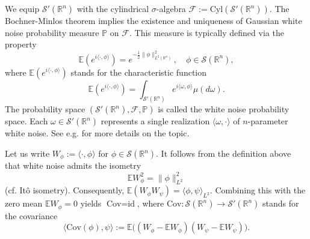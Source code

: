 \documentclass[10pt,a4paper]{article}
\theoremstyle{plain}
\theoremstyle{definition}
\theoremstyle{remark}
\newtheorem{remark}[theorem]{Remark}
\numberwithin{equation}{section}
\newcommand{\R}{\mathbb{R}}
\newcommand{\E}{\mathbb{E}} %
\newcommand{\Cyl}{\text{Cyl}}
\begin{document}
%
We equip $\mathcal{S}'(\R^n)$ with 
 the cylindrical $\sigma$-algebra $\mathcal{F}:=\Cyl ( \mathcal{S}'(\R^n))$.
The Bochner-Minlos theorem \cite[Theorem 2.1]{hida-lectures-book}
% 
 implies the existence and uniqueness of Gaussian white noise probability measure $\mathbb{P}$ on $\mathcal{F}$. 
This measure is  typically defined via the property
 \[
 \E  ( e^{i \langle \cdot, \phi \rangle  } )
 = e^{- \frac{1}{2} \| \phi \|^2_{L^2(\R^n)} }, \quad \phi \in \mathcal{S}(\R^n),
 \]
 where $\E ( e^{i \langle \cdot, \phi \rangle  } ) $ stands for the characteristic function
 \[
 \E  ( e^{i \langle \cdot, \phi \rangle  } ) = \int_{\mathcal{S}'(\R^n) } e^{i \langle \omega , \phi \rangle }  \mu (d\omega). 
 \]
The probability space $(\mathcal{S}'(\R^n),   \mathcal{F} , \mathbb{P} )$ is called the white noise probability space. 
Each $\omega \in \mathcal{S}'(\R^n)$ represents a single realization $\langle \omega, \cdot \rangle$ of $n$-parameter white noise. See e.g. \cite{hida-lectures-book, kuo-book} for more details on the topic.



 Let us write $W_\phi := \langle   \cdot, \phi \rangle  $ for $\phi \in \mathcal{S}({\R^n})$. 
It follows from the definition above that white noise admits the isometry 
 \begin{equation}\label{itolike}
 \E W_\phi^2  =  \| \phi \|^2_{L^2}
 \end{equation} 
 (cf. {It\^o} isometry). Consequently, $\E(W_\phi W_\psi ) = \langle \phi, \psi \rangle_{L^2}$. 
Combining this with the zero mean $\E W_\phi = 0 $ yields $\text{Cov} = \text{id}$, where $\text{Cov} : \mathcal{S}( {\R^n})  \to \mathcal{S}'( {\R^n})$ stands for the covariance
 \[
  \langle \text{Cov} (\phi ), \psi \rangle := \E \Big(  ( W_\phi-   \E W_\phi ) (  W_\psi - \E W_\psi) \Big) .
 \]
\end{document}
